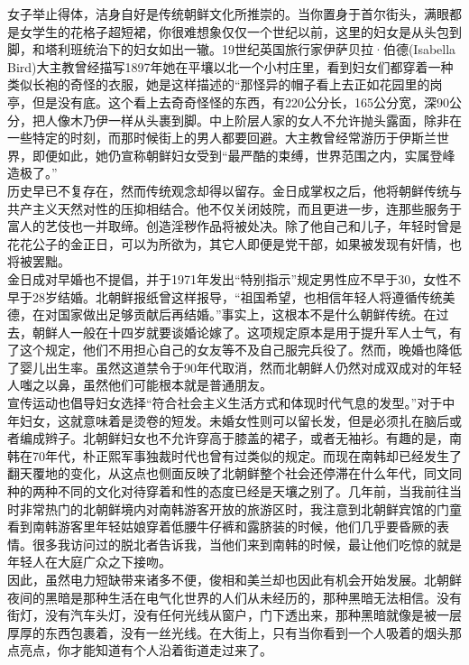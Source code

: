 \begin{multicols}{\theparacolNo}
女子举止得体，洁身自好是传统朝鲜文化所推崇的。当你置身于首尔街头，满眼都是女学生的花格子超短裙，你很难想象仅仅一个世纪以前，这里的妇女是从头包到脚，和塔利班统治下的妇女如出一辙。19世纪英国旅行家伊萨贝拉·伯德(Isabella Bird)大主教曾经描写1897年她在平壤以北一个小村庄里，看到妇女们都穿着一种类似长袍的奇怪的衣服，她是这样描述的“那怪异的帽子看上去正如花园里的岗亭，但是没有底。这个看上去奇奇怪怪的东西，有220公分长，165公分宽，深90公分，把人像木乃伊一样从头裹到脚。中上阶层人家的女人不允许抛头露面，除非在一些特定的时刻，而那时候街上的男人都要回避。大主教曾经常游历于伊斯兰世界，即便如此，她仍宣称朝鲜妇女受到“最严酷的束缚，世界范围之内，实属登峰造极了。”\\

历史早已不复存在，然而传统观念却得以留存。金日成掌权之后，他将朝鲜传统与共产主义天然对性的压抑相结合。他不仅关闭妓院，而且更进一步，连那些服务于富人的艺伎也一并取缔。创造淫秽作品将被处决。除了他自己和儿子，年轻时曾是花花公子的金正日，可以为所欲为，其它人即便是党干部，如果被发现有奸情，也将被罢黜。\\

金日成对早婚也不提倡，并于1971年发出“特别指示”规定男性应不早于30，女性不早于28岁结婚。北朝鲜报纸曾这样报导，“祖国希望，也相信年轻人将遵循传统美德，在对国家做出足够贡献后再结婚。”事实上，这根本不是什么朝鲜传统。在过去，朝鲜人一般在十四岁就要谈婚论嫁了。这项规定原本是用于提升军人士气，有了这个规定，他们不用担心自己的女友等不及自己服完兵役了。然而，晚婚也降低了婴儿出生率。虽然这道禁令于90年代取消，然而北朝鲜人仍然对成双成对的年轻人嗤之以鼻，虽然他们可能根本就是普通朋友。\\

宣传运动也倡导妇女选择“符合社会主义生活方式和体现时代气息的发型。”对于中年妇女，这就意味着是烫卷的短发。未婚女性则可以留长发，但是必须扎在脑后或者编成辫子。北朝鲜妇女也不允许穿高于膝盖的裙子，或者无袖衫。有趣的是，南韩在70年代，朴正熙军事独裁时代也曾有过类似的规定。而现在南韩却已经发生了翻天覆地的变化，从这点也侧面反映了北朝鲜整个社会还停滞在什么年代，同文同种的两种不同的文化对待穿着和性的态度已经是天壤之别了。几年前，当我前往当时非常热门的北朝鲜境内对南韩游客开放的旅游区时，我注意到北朝鲜宾馆的门童看到南韩游客里年轻姑娘穿着低腰牛仔裤和露脐装的时候，他们几乎要昏厥的表情。很多我访问过的脱北者告诉我，当他们来到南韩的时候，最让他们吃惊的就是年轻人在大庭广众之下接吻。\\

因此，虽然电力短缺带来诸多不便，俊相和美兰却也因此有机会开始发展。北朝鲜夜间的黑暗是那种生活在电气化世界的人们从未经历的，那种黑暗无法相信。没有街灯，没有汽车头灯，没有任何光线从窗户，门下透出来，那种黑暗就像是被一层厚厚的东西包裹着，没有一丝光线。在大街上，只有当你看到一个人吸着的烟头那点亮点，你才能知道有个人沿着街道走过来了。\\


\end{multicols}
